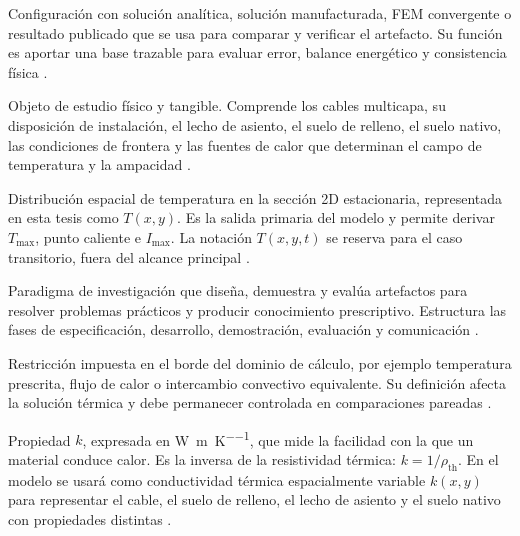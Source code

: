 \documentclass[11pt,a4paper,oneside]{report}
\newcommand{\Tmax}{T_{\max}}
\newcommand{\Imax}{I_{\max}}
\newcommand{\kx}{k(x,y)}
\newcommand{\rhoth}{\rho_{\mathrm{th}}}
\begin{document}
\begin{description}[style=nextline,itemsep=0.5\baselineskip,parsep=0pt,topsep=0.25\baselineskip]
  \item[Caso de referencia o \textit{benchmark}.] Configuración con solución analítica, solución manufacturada, FEM convergente o resultado publicado que se usa para comparar y verificar el artefacto. Su función es aportar una base trazable para evaluar error, balance energético y consistencia física \parencites{cigre2022}[93--99]{cigre2025}.

  \item[Arreglo de cables--entorno térmico.] Objeto de estudio físico y tangible. Comprende los cables multicapa, su disposición de instalación, el lecho de asiento, el suelo de relleno, el suelo nativo, las condiciones de frontera y las fuentes de calor que determinan el campo de temperatura y la ampacidad \parencites[752--760]{neher1957}{anders2005}[3--5]{enescu2020}[4--6]{enescu2021}[1,10,16]{kim2025}.

  \item[Campo de temperatura.] Distribución espacial de temperatura en la sección 2D estacionaria, representada en esta tesis como $T(x,y)$. Es la salida primaria del modelo y permite derivar $\Tmax$, punto caliente e $\Imax$. La notación $T(x,y,t)$ se reserva para el caso transitorio, fuera del alcance principal \parencites{carslaw1959conduction,kakac2018heatConduction,hahn2012heatConduction}[1,3,16]{pan2025}.

  \item[Ciencia del diseño o DSR.] Paradigma de investigación que diseña, demuestra y evalúa artefactos para resolver problemas prácticos y producir conocimiento prescriptivo. Estructura las fases de especificación, desarrollo, demostración, evaluación y comunicación \parencites[54--56]{peffers2007}[342--351]{gregor2013}[198--203]{delport2024}.

  \item[Condición de contorno.] Restricción impuesta en el borde del dominio de cálculo, por ejemplo temperatura prescrita, flujo de calor o intercambio convectivo equivalente. Su definición afecta la solución térmica y debe permanecer controlada en comparaciones pareadas \parencites{carslaw1959conduction,kakac2018heatConduction,hahn2012heatConduction}[3--5]{enescu2020}[3--4,93--99]{cigre2025}.

  \item[Conductividad térmica.] Propiedad $k$, expresada en \si{\watt\per\metre\per\kelvin}, que mide la facilidad con la que un material conduce calor. Es la inversa de la resistividad térmica: $k=1/\rhoth$. En el modelo se usará como conductividad térmica espacialmente variable $\kx$ para representar el cable, el suelo de relleno, el lecho de asiento y el suelo nativo con propiedades distintas \parencites{carslaw1959conduction,kakac2018heatConduction}{farouki1981thermal,devries1966thermal}[1,7]{khumalo2025}[secciones 4--6]{ieee442}.


\end{description}
\end{document}
